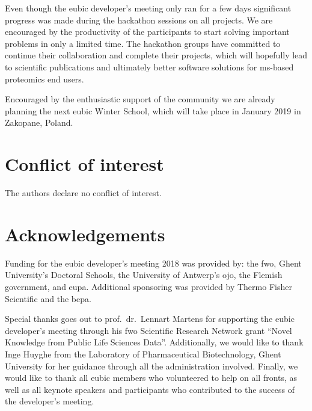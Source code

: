 \documentclass[fontsize=11pt, paper=a4, titlepage=false]{scrartcl}
\begin{document}
Even though the \gls{eubic} developer's meeting only ran for a few days 
significant progress was made during the hackathon sessions on all projects. We 
are encouraged by the productivity of the participants to start solving 
important problems in only a limited time. The hackathon groups have committed 
to continue their collaboration and complete their projects, which will 
hopefully lead to scientific publications and ultimately better software 
solutions for \gls{ms}-based proteomics end users.

Encouraged by the enthusiastic support of the community we are already planning 
the next \gls{eubic} Winter School, which will take place in January 2019 in 
Zakopane, Poland.

\section*{Conflict of interest}

The authors declare no conflict of interest.

\section*{Acknowledgements}

Funding for the \gls{eubic} developer's meeting 2018 was provided by: the 
\gls{fwo}, Ghent University's Doctoral Schools, the University of Antwerp's 
\gls{ojo}, the Flemish government, and \gls{eupa}. Additional sponsoring was 
provided by Thermo Fisher Scientific and the \gls{bepa}.

Special thanks goes out to prof.~dr.~Lennart Martens for supporting the 
\gls{eubic} developer's meeting through his \gls{fwo} Scientific Research 
Network grant ``Novel Knowledge from Public Life Sciences Data''.
Additionally, we would like to thank Inge Huyghe from the Laboratory of 
Pharmaceutical Biotechnology, Ghent University for her guidance through all the 
administration involved.
Finally, we would like to thank all \gls{eubic} members who volunteered to help 
on all fronts, as well as all keynote speakers and participants who contributed 
to the success of the developer's meeting.


\printbibliography
\end{document}
